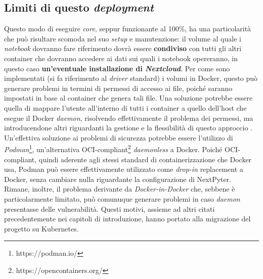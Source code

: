 \subsection{Limiti di questo \textit{deployment}}
Questo modo di eseguire \textit{core}, seppur funzionante al 100\%, ha una particolarità che può risultare scomoda nel suo \textit{setup} e manutenzione: il volume al quale i \textit{notebook} dovranno fare riferimento dovrà essere \textbf{condiviso} con tutti gli altri container che dovranno accedere ai dati sui quali i notebook opereranno, in questo caso \textbf{un'eventuale installazione di \textit{Nextcloud}}. Per come sono implementati (si fa riferimento al \textit{driver} standard) i volumi in Docker, questo può generare problemi in termini di permessi di accesso ai file, poiché saranno impostati in base al container che genera tali file. Una soluzione potrebbe essere quella di mappare l'utente all'interno di tutti i container a quello dell'host che esegue il Docker \textit{daemon}, risolvendo effettivamente il problema dei permessi, ma introducendone altri riguardanti la gestione e la flessibilità di questo approccio \cite{owasp-docker}.
\newline
Un'effettiva soluzione ai problemi di sicurezza potrebbe essere l'utilizzo di \textit{Podman}\footnote{https://podman.io/}, un'alternativa OCI-compliant\footnote{https://opencontainers.org/} \textit{daemonless} a Docker. Poiché OCI-compliant, quindi aderente agli stessi standard di containerizzazione che Docker usa, Podman può essere effettivamente utilizzato come \textit{drop-in} replacement a Docker, senza cambiare nulla riguardante la configurazione di NextPyter.
\newline
Rimane, inoltre, il problema derivante da \textit{Docker-in-Docker} che, sebbene è particolarmente limitato, può comunuque generare problemi in caso \textit{daemon} presentasse delle vulnerabilità.
\newline
Questi motivi, assieme ad altri citati precedentemente nei capitoli di introduzione, hanno portato alla migrazione del progetto su Kubernetes.
\newpage

